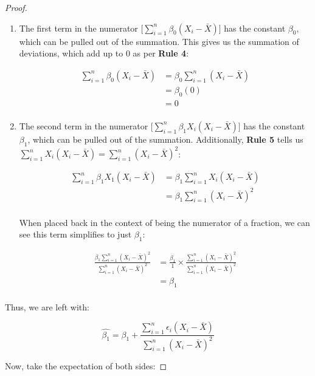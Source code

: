 \documentclass{article}
\begin{document}
\begin{proof}
\begin{enumerate}
\item 	The first term in the numerator $\bigg[\displaystyle \sum^n_{i=1} \beta_0(X_i-\bar{X})\bigg]$ has the constant $\beta_0$, which can be pulled out of the summation. This gives us the summation of deviations, which add up to 0 as per \textbf{Rule 4}:

\begin{align*}
\displaystyle \sum^n_{i=1} \beta_0(X_i-\bar{X})&= \beta_0 \displaystyle \sum^n_{i=1} (X_i-\bar{X})\\
&=\beta_0 (0)\\
&=0\\
\end{align*}

\item The second term in the numerator  $\bigg[\displaystyle \sum^n_{i=1} \beta_1X_i(X_i-\bar{X})\bigg]$ has the constant $\beta_1$, which can be pulled out of the summation. Additionally, \textbf{Rule 5} tells us $\displaystyle \sum^n_{i=1} X_i(X_i-\bar{X})=\displaystyle \sum^n_{i=1}(X_i-\bar{X})^2$:

\begin{align*}
\displaystyle \sum^n_{i=1} \beta_1X_1(X_i-\bar{X})&= \beta_1 \displaystyle \sum^n_{i=1} X_i(X_i-\bar{X})\\
&=\beta_1\displaystyle \sum^n_{i=1}(X_i-\bar{X})^2\\
\end{align*}

When placed back in the context of being the numerator of a fraction, we can see this term simplifies to just $\beta_1$:

\begin{align*}
	\frac{\beta_1\displaystyle \sum^n_{i=1}(X_i-\bar{X})^2}{\displaystyle\sum^n_{i=1} (X_i-\bar{X})^2} &=\frac{\beta_1}{1} \times \frac{\displaystyle \sum^n_{i=1}(X_i-\bar{X})^2}{\displaystyle\sum^n_{i=1} (X_i-\bar{X})^2}\\
	&=\beta_1	\\
\end{align*}

\end{enumerate}

Thus, we are left with: 

\begin{equation}
\hat{\beta_1}=\beta_1+\frac{\displaystyle \sum^n_{i=1} \epsilon_i(X_i-\bar{X})}{\displaystyle\sum^n_{i=1} (X_i-\bar{X})^2}
\end{equation}

Now, take the expectation of both sides:


\end{proof}
\end{document}
